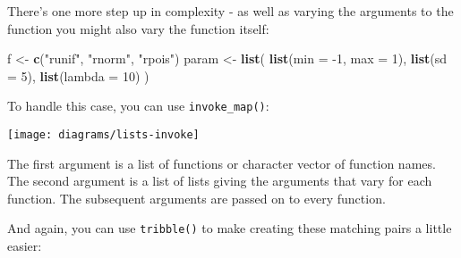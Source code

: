 \documentclass[]{book}
\newenvironment{Shaded}{\begin{snugshade}}{\end{snugshade}}
\newcommand{\KeywordTok}[1]{\textcolor[rgb]{0.13,0.29,0.53}{\textbf{{#1}}}}
\newcommand{\DataTypeTok}[1]{\textcolor[rgb]{0.13,0.29,0.53}{{#1}}}
\newcommand{\DecValTok}[1]{\textcolor[rgb]{0.00,0.00,0.81}{{#1}}}
\newcommand{\StringTok}[1]{\textcolor[rgb]{0.31,0.60,0.02}{{#1}}}
\newcommand{\CommentTok}[1]{\textcolor[rgb]{0.56,0.35,0.01}{\textit{{#1}}}}
\newcommand{\NormalTok}[1]{{#1}}
\begin{document}
There's one more step up in complexity - as well as varying the
arguments to the function you might also vary the function itself:

\begin{Shaded}
\begin{Highlighting}[]
\NormalTok{f <-}\StringTok{ }\KeywordTok{c}\NormalTok{(}\StringTok{"runif"}\NormalTok{, }\StringTok{"rnorm"}\NormalTok{, }\StringTok{"rpois"}\NormalTok{)}
\NormalTok{param <-}\StringTok{ }\KeywordTok{list}\NormalTok{(}
  \KeywordTok{list}\NormalTok{(}\DataTypeTok{min =} \NormalTok{-}\DecValTok{1}\NormalTok{, }\DataTypeTok{max =} \DecValTok{1}\NormalTok{), }
  \KeywordTok{list}\NormalTok{(}\DataTypeTok{sd =} \DecValTok{5}\NormalTok{), }
  \KeywordTok{list}\NormalTok{(}\DataTypeTok{lambda =} \DecValTok{10}\NormalTok{)}
\NormalTok{)}
\end{Highlighting}
\end{Shaded}

To handle this case, you can use \texttt{invoke\_map()}:

\begin{Shaded}
\end{Shaded}

\begin{center}\texttt{[image: diagrams/lists-invoke]} \end{center}

The first argument is a list of functions or character vector of
function names. The second argument is a list of lists giving the
arguments that vary for each function. The subsequent arguments are
passed on to every function.

And again, you can use \texttt{tribble()} to make creating these
matching pairs a little easier:

\begin{Shaded}
\end{Shaded}
\end{document}
